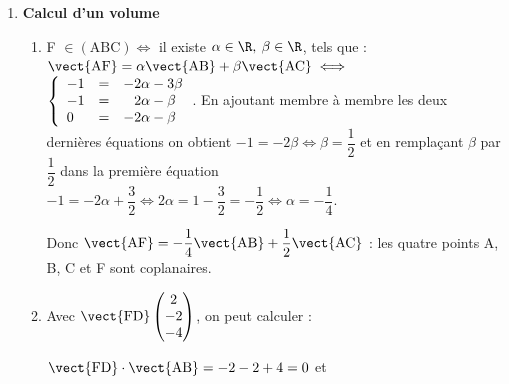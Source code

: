 \begin{enumerate}
\begin{enumerate}
	Comme AC = $\text{BC} = \sqrt{11}$, le triangle ABC est isocèle en C ; or on a vu que E est le projeté de C sur la droite (AB), donc dans le triangle isocèle (ABC), [CE] est la hauteur relative à la base [AB].
	
On a $\vect{\text{CE}}\begin{pmatrix}2\\2\\0\end{pmatrix}$, d'où CE$^2 = 1 + 4 = 8$ et CE $ = 2\sqrt{2}$.

 L'aire du triangle (ABC) est donc égale à :
	
$\mathcal{A}(\text{ABC}) = \dfrac{\text{AB} \times \text{CE}}{2} = \dfrac{2\sqrt{3} \times 2\sqrt{2}}{2} = 2 \sqrt{6}$.
		
	\end{enumerate}
\item \textbf{Calcul d'un volume}
	\begin{enumerate}
		\item %
F $\in (\text{ABC}) \iff $ il existe $\alpha \in \R, \: \beta \in \R$, tels que :
$\vect{\text{AF}} = \alpha \vect{\text{AB}} + \beta\vect{\text{AC}} \iff$\\

$  \left\{\begin{array}{l c l}
- 1 &=&- 2\alpha -3 \beta\\
- 1&=&\phantom{-}2\alpha - \beta\\
0 &=&- 2\alpha - \beta 
\end{array}\right.$. En ajoutant membre à membre les deux dernières équations on obtient $- 1 = - 2\beta \iff \beta =  \dfrac12$ et en remplaçant $\beta$ par $ \dfrac12$ dans la première équation $- 1 = - 2\alpha + \dfrac32 \iff 2\alpha = 1  - \dfrac32 = - \dfrac12 \iff \alpha = - \dfrac14$.

Donc $\vect{\text{AF}} = - \dfrac14 \vect{\text{AB}} + \dfrac12\vect{\text{AC}}$ : les quatre points A, B, C et F sont coplanaires.
		\item %
Avec $\vect{\text{FD}}\begin{pmatrix}2\\-2\\-4\end{pmatrix}$, on peut calculer :
		
$\vect{\text{FD}}\cdot \vect{\text{AB}} = - 2 - 2 + 4 = 0$ et 


\end{enumerate}
\end{enumerate}
